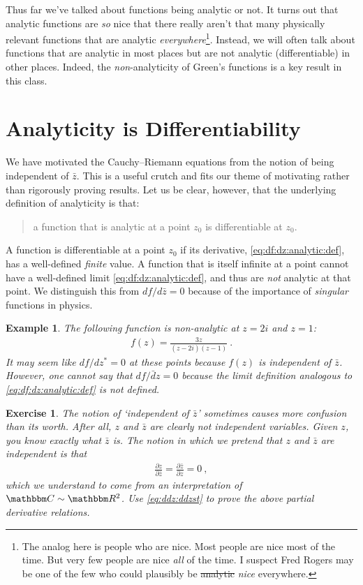 \documentclass[
  11pt,
	colorful,
	raggedright,
]{tufte-style-thesis-flip}
\newtheorem{exercise}{Exercise}[section]
\newtheorem{example}{Example}[section]
\begin{document}
Thus far we've talked about functions being analytic or not. It turns out that analytic functions are \emph{so} nice that there really aren't that many physically relevant functions that are analytic \emph{everywhere}\footnote{The analog here is people who are nice. Most people are nice most of the time. But very few people are nice \emph{all} of the time. I suspect Fred Rogers may be one of the few who could plausibly be \sout{analytic} \emph{nice} everywhere.}. Instead, we will often talk about functions that are analytic in most places but are not analytic (differentiable) in other places. Indeed, the \emph{non}-analyticity of Green's functions is a key result in this class.


\section{Analyticity is Differentiability}

We have motivated the Cauchy--Riemann equations from the notion of being independent of $\bar z$. This is a useful crutch and fits our theme of motivating rather than rigorously proving results. Let us be clear, however, that the underlying definition of analyticity is that:
\begin{quote}
a function that is analytic at a point $z_0$ is differentiable at $z_0$.
\end{quote}
A function is differentiable at a point $z_0$ if its derivative, \eqref{eq:df:dz:analytic:def}, has a well-defined \emph{finite} value. A function that is itself infinite at a point cannot have a well-defined limit \eqref{eq:df:dz:analytic:def}, and thus are \emph{not} analytic at that point.
We distinguish this from $df/d\bar z =0$ because of the importance of \emph{singular} functions in physics. 
\begin{example}
The following function is non-analytic at $z=2i$ and $z=1$:
\begin{align}
  f(z) = \frac{3z}{(z-2i)(z-1)} \ .
\end{align}
It may seem like $df/dz^* = 0$ at these points because $f(z)$ is independent of $\bar z$. However, one cannot say that $df/\bar dz=0$ because the limit definition analogous to \eqref{eq:df:dz:analytic:def} is not defined. 
\end{example}
\begin{exercise}
The notion of `independent of $\bar z$' sometimes causes more confusion than its worth. After all, $z$ and $\bar z$ are clearly \emph{not} independent variables. Given $z$, you know exactly what $\bar z$ is. The notion in which we \emph{pretend} that $z$ and $\bar z$ are independent is that
\begin{align}
  \frac{\partial z}{\partial \bar z} = 
  \frac{\partial \bar z}{\partial z} = 0 \ ,
\end{align}
which we understand to come from an interpretation of $\mathbbm C \sim \mathbbm R^2$. Use \eqref{eq:ddz:ddzst} to prove the above partial derivative relations.
\end{exercise}
\end{document}
